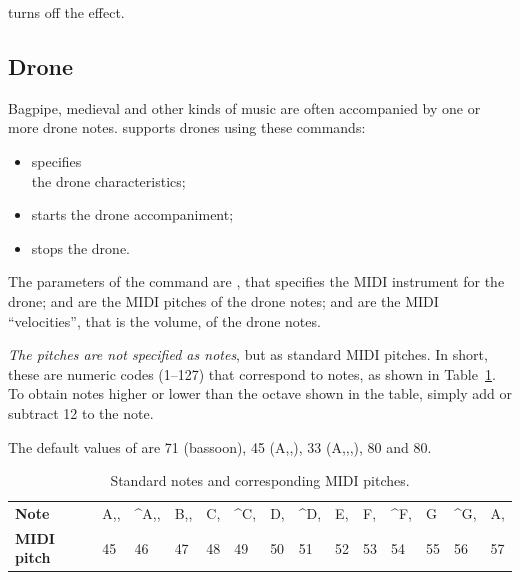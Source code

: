 \documentclass[a4paper,12pt]{book}
\begin{document}
 turns off the effect.


\subsection{Drone}
\label{sec:drone}

Bagpipe, medieval and other kinds of music are often accompanied by one or
more drone notes. \abcmid{} supports drones using these commands:

\begin{itemize}
  
  \item {} specifies\\
  the drone characteristics;
  
  \item {} starts the drone accompaniment;
  
  \item {} stops the drone.
  
\end{itemize}

The parameters of the  command are
, that specifies the MIDI instrument for the drone;
 and  are the MIDI pitches of the drone
notes;  and  are the MIDI ``velocities'', that
is the volume, of the drone notes.

\emph{The pitches are not specified as \ABC{} notes}, but as standard
MIDI pitches. In short, these are numeric codes (1--127) that correspond to
notes, as shown in Table~\ref{tab:midipitch}. To obtain notes higher or
lower than the octave shown in the table, simply add or subtract 12 to the
note.

The default values of  are 71 (bassoon), 45 (A,,), 33
(A,,,), 80 and 80.

\begin{table}[htbp]
\centering
\begin{tabular}{llllllllllllll}
\toprule %
\textbf{Note} & A,, & \^{}A,, & B,, & C, & \^{}C, & D, & \^{}D, & E, &
F, & \^{}F, & G & \^{}G, & A, \\
\textbf{MIDI pitch} & 45 & 46 & 47 & 48 & 49 & 50 & 51 & 52 & 53 &
54 & 55 & 56 & 57 \\
\bottomrule \hline
\end{tabular}
\caption{Standard notes and corresponding MIDI pitches.}
\label{tab:midipitch}
\end{table}
\end{document}
